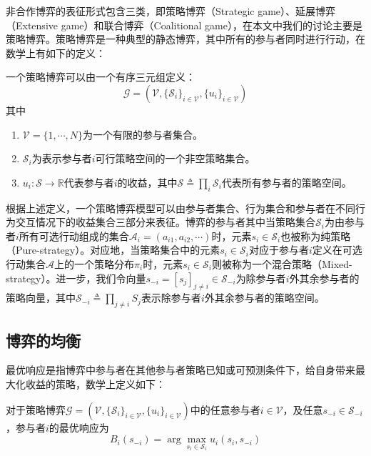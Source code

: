 非合作博弈的表征形式包含三类，即策略博弈（Strategic game）、延展博弈（Extensive game）和联合博弈（Coalitional game），在本文中我们的讨论主要是策略博弈\cite{osborne}。策略博弈是一种典型的静态博弈，其中所有的参与者同时进行行动，在数学上有如下的定义：
\begin{df}[策略博弈]
一个策略博弈可以由一个有序三元组定义：
\begin{equation}
\mathcal{G}=(\mathcal{V},\{\mathcal{S}_i\}_{i\in\mathcal{V}},\{u_i\}_{i\in\mathcal{V}})
\end{equation}
其中
\begin{enumerate}
\item $\mathcal{V}=\{1,\cdots,N\}$为一个有限的参与者集合。
\item $\mathcal{S}_i$为表示参与者$i$可行策略空间的一个非空策略集合。
\item $u_i: \mathcal{S}\rightarrow  \mathbb{R}$代表参与者$i$的收益，其中$\mathcal{S}\triangleq\prod_i\mathcal{S}_i$代表所有参与者的策略空间。
\end{enumerate}
\end{df}
根据上述定义，一个策略博弈模型可以由参与者集合、行为集合和参与者在不同行为交互情况下的收益集合三部分来表征。博弈的参与者其中当策略集合$\mathcal{S}_i$为由参与者$i$所有可选行动组成的集合$\mathcal{A}_i=(a_{i1},a_{i2},\cdots)$时，元素$s_i\in\mathcal{S}_i$也被称为纯策略（Pure-strategy）。对应地，当策略集合中的元素$s_i\in\mathcal{S}_i$对应于参与者$i$定义在可选行动集合$\mathcal{A}$上的一个策略分布$\pi_i$时，元素$s_i\in\mathcal{S}_i$则被称为一个混合策略（Mixed-strategy）。进一步，我们令向量$s_{-i}=[s_j]_{j\neq i}\in\mathcal{S}_{-i}$为除参与者$i$外其余参与者的策略向量，其中$\mathcal{S}_{-i}\triangleq\prod_{j\neq i}S_j$表示除参与者$i$外其余参与者的策略空间。


\subsection{博弈的均衡}\label{sec:neconcept}

最优响应是指博弈中参与者在其他参与者策略已知或可预测条件下，给自身带来最大化收益的策略\cite{osborne,Fudenberg}，数学上定义如下：
\begin{df}[最优响应]
对于策略博弈$\mathcal{G}=(\mathcal{V},\{\mathcal{S}_i\}_{i\in\mathcal{V}},\{u_i\}_{i\in\mathcal{V}})$中的任意参与者$i\in\mathcal{V}$，及任意$s_{-i}\in\mathcal{S}_{-i}$，参与者$i$的最优响应为
\begin{equation}
B_i(s_{-i})=\arg\max_{s_i\in\mathcal{S}_i}u_i(s_i,s_{-i})
\end{equation}
\end{df}

